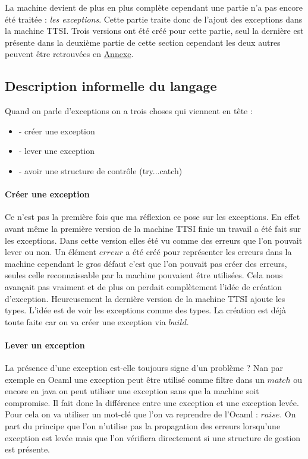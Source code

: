 \documentclass[10pt,a4paper]{report}
\begin{document}
	La machine devient de plus en plus complète cependant une partie n'a pas encore été traitée : \textit{les exceptions}. Cette partie traite donc de l'ajout des exceptions dans la machine TTSI. Trois versions ont été créé pour cette partie, seul la dernière est présente dans la deuxième partie de cette section cependant les deux autres peuvent être retrouvées en \hyperref[SECDConc4]{Annexe}.
	
	\subsection{Description informelle du langage}
	
	Quand on parle d'exceptions on a trois choses qui viennent en tête :
	\begin{itemize}
		\item[] - créer une exception
		\item[] - lever une exception
		\item[] - avoir une structure de contrôle (try...catch)
	\end{itemize}
	\medbreak
	
	\paragraph{Créer une exception }
	Ce n'est pas la première fois que ma réflexion ce pose sur les exceptions. En effet avant même la première version de la machine TTSI finie un travail a été fait sur les exceptions. Dans cette version elles été vu comme des erreurs que l'on pouvait lever ou non. Un élément $erreur$ a été créé pour représenter les erreurs dans la machine cependant le gros défaut c'est que l'on pouvait pas créer des erreurs, seules celle reconnaissable par la machine pouvaient être utilisées. Cela nous avançait pas vraiment et de plus on perdait complètement l'idée de création d'exception. Heureusement la dernière version de la machine TTSI ajoute les types. L'idée est de voir les exceptions comme des types. La création est déjà toute faite car on va créer une exception via $build$.
	\medbreak
	
	\paragraph{Lever un exception }
	La présence d'une exception est-elle toujours signe d'un problème ? Nan par exemple en Ocaml une exception peut être utilisé comme filtre dans un $match$ ou encore en java on peut utiliser une exception sans que la machine soit compromise. Il fait donc la différence entre une exception et une exception levée. Pour cela on va utiliser un mot-clé que l'on va reprendre de l'Ocaml : $raise$. On part du principe que l'on n'utilise pas la propagation des erreurs lorsqu'une exception est levée mais que l'on vérifiera directement si une structure de gestion est présente.
	\medbreak
	
\end{document}
